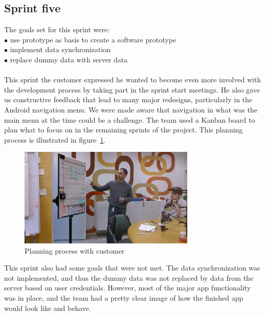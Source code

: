 \subsection{Sprint five}
The goals set for this sprint were:\\
$\bullet$\hspace{0.25cm} use prototype as basis to create a software prototype\\
$\bullet$\hspace{0.25cm} implement data synchronization\\
$\bullet$\hspace{0.25cm} replace dummy data with server data\\\\
This sprint the customer expressed he wanted to become even more involved with the development process by taking part in the sprint start meetings.
He also gave us constructive feedback that lead to many major redesigns, particularly in the Android navigation menu. We were made aware that navigation in what was the main menu at the time could be a challenge. The team used a Kanban board to plan what to focus on in the remaining sprints of the project. This planning process is illustrated in figure~\ref{fig:kanban}.

\begin{figure}[htp]
\centering
\includegraphics[width=0.75\textwidth, clip, trim=5cm 0cm 0cm 0cm]{ch/devProcess/fig/kanban.jpg}
\caption{Planning process with customer}
\label{fig:kanban}
\end{figure}

\noindent This sprint also had some goals that were not met. The data synchronization was not implemented, and thus the dummy data was not replaced by data from the server based on user credentials. However, most of the major app functionality was in place, and the team had a pretty clear image of how the finished app would look like and behave.

